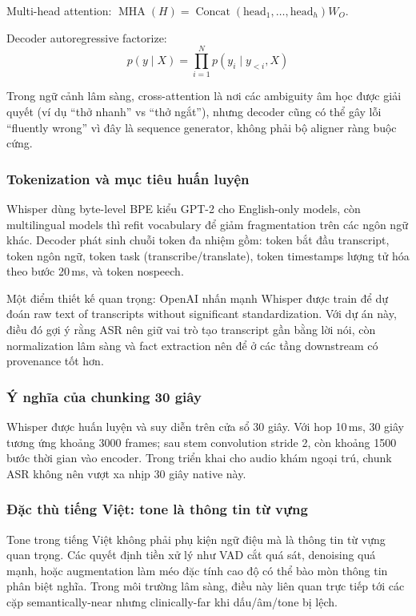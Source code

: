 Multi-head attention: $\operatorname{MHA}(H) = \operatorname{Concat}(\text{head}_1, \dots, \text{head}_h)W_O$.

Decoder autoregressive factorize:
\[
p(y \mid X) = \prod_{i=1}^{N} p(y_i \mid y_{<i}, X)
\]

Trong ngữ cảnh lâm sàng, cross-attention là nơi các ambiguity âm học được giải quyết (ví dụ ``thở nhanh'' vs ``thở ngắt''), nhưng decoder cũng có thể gây lỗi ``fluently wrong'' vì đây là sequence generator, không phải bộ aligner ràng buộc cứng.

\subsubsection{Tokenization và mục tiêu huấn luyện}

Whisper dùng byte-level BPE kiểu GPT-2 cho English-only models, còn multilingual models thì refit vocabulary để giảm fragmentation trên các ngôn ngữ khác. Decoder phát sinh chuỗi token đa nhiệm gồm: token bắt đầu transcript, token ngôn ngữ, token task (transcribe/translate), token timestamps lượng tử hóa theo bước 20\,ms, và token nospeech.

Một điểm thiết kế quan trọng: OpenAI nhấn mạnh Whisper được train để dự đoán raw text of transcripts without significant standardization. Với dự án này, điều đó gợi ý rằng ASR nên giữ vai trò tạo transcript gần bằng lời nói, còn normalization lâm sàng và fact extraction nên để ở các tầng downstream có provenance tốt hơn.

\subsubsection{Ý nghĩa của chunking 30 giây}

Whisper được huấn luyện và suy diễn trên cửa sổ 30 giây. Với hop 10\,ms, 30 giây tương ứng khoảng 3000 frames; sau stem convolution stride 2, còn khoảng 1500 bước thời gian vào encoder. Trong triển khai cho audio khám ngoại trú, chunk ASR không nên vượt xa nhịp 30 giây native này.

\subsubsection{Đặc thù tiếng Việt: tone là thông tin từ vựng}

Tone trong tiếng Việt không phải phụ kiện ngữ điệu mà là thông tin từ vựng quan trọng. Các quyết định tiền xử lý như VAD cắt quá sát, denoising quá mạnh, hoặc augmentation làm méo đặc tính cao độ có thể bào mòn thông tin phân biệt nghĩa. Trong môi trường lâm sàng, điều này liên quan trực tiếp tới các cặp semantically-near nhưng clinically-far khi dấu/âm/tone bị lệch.

